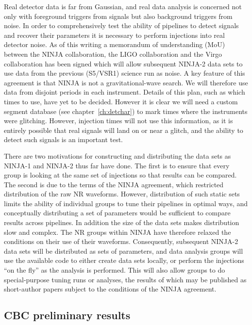 Real detector data is far from Gaussian, and real data analysis is
concerned not only with foreground triggers from signals but also
background triggers from noise.  In order to comprehensively test the
ability of pipelines to detect signals and recover their parameters it
is necessary to perform injections into real detector noise.  As of
this writing a memorandum of understanding (MoU) between the NINJA
collaboration, the LIGO collaboration and the Virgo collaboration has
been signed which will allow subsequent NINJA-2 data sets to use data
from the previous (S5/VSR1) science run as noise.  A key feature of
this agreement is that NINJA is not a gravitational-wave search.  We
will therefore use data from disjoint periods in each instrument.
Details of this plan, such as which times to use, have yet to be
decided.  However it is clear we will need a custom segment database
(see chapter~\ref{ch:detchar}) to mark times where the instruments
were glitching. However, injection times will not use this
information, as it is entirely possible that real signals will land on
or near a glitch, and the ability to detect such signals is an
important test.
 
There are two motivations for constructing and distributing the data
sets as NINJA-1 and NINJA-2 thus far have done.  The first is to
ensure that every group is looking at the same set of injections so
that results can be compared.  The second is due to the terms of the
NINJA agreement, which restricted distribution of the raw NR
waveforms.  However, distribution of such static sets limits the
ability of individual groups to tune their pipelines in optimal ways,
and conceptually distributing a set of parameters would be sufficient
to compare results across pipelines.  In addition the size of the data
sets makes distribution slow and complex.  The NR groups within NINJA
have therefore relaxed the conditions on their use of their waveforms.
Consequently, subsequent NINJA-2 data sets will be distributed as sets
of parameters, and data analysis groups will use the available code to
either create data sets locally, or perform the injections ``on the
fly'' as the analysis is performed.  This will also allow groups to do
special-purpose tuning runs or analyses, the results of which may be
published as short-author papers subject to the conditions of the
NINJA agreement.


\subsection{CBC preliminary results}


